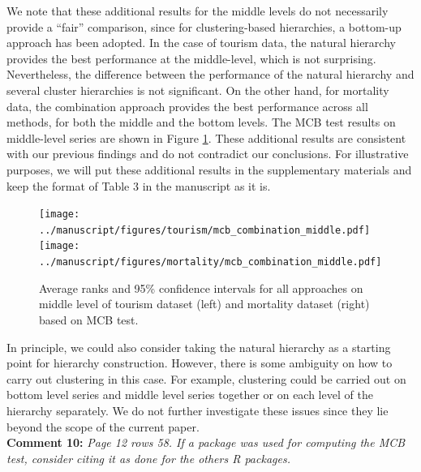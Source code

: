 \documentclass{article}
\numberwithin{equation}{section}
\theoremstyle{plain}
\theoremstyle{definition}
\theoremstyle{remark}
\begin{document}
We note that these additional results for the middle levels do not necessarily provide a ``fair'' comparison, since for clustering-based hierarchies, a bottom-up approach has been adopted.  In the case of tourism data, the natural hierarchy provides the best performance at the middle-level, which is not surprising. Nevertheless, the difference between the performance of the natural hierarchy and several cluster hierarchies is not significant. On the other hand, for mortality data, the combination approach provides the best performance across all methods, for both the middle and the bottom levels. {The MCB test results on middle-level series are shown in Figure \ref{fig:mcb_middle}.} These additional results are consistent with our previous findings and do not contradict our conclusions. For illustrative purposes, we will put these additional results in the supplementary materials and keep the format of Table 3 in the manuscript as it is.\\

\begin{figure}[h!]
    \centering
    \texttt{[image: ../manuscript/figures/tourism/mcb\_combination\_middle.pdf]}
    \texttt{[image: ../manuscript/figures/mortality/mcb\_combination\_middle.pdf]}
    \caption{\label{fig:mcb_middle}Average ranks and 95\% confidence intervals for all approaches on middle level of tourism dataset (left) and mortality dataset (right) based on MCB test.}
\end{figure}

\medskip
In principle, we could also consider taking the natural hierarchy as a starting point for hierarchy construction.
However, there is some ambiguity on how to carry out clustering in this case. For example, clustering could be carried out on bottom level series and middle level series together or on each level of the hierarchy separately. We do not further investigate these issues since they lie beyond the scope of the current paper.\\


\textbf{Comment 10:} \textit{Page 12 rows 58. If a package was used for computing the MCB test, consider citing it as done for the others R packages.}
\end{document}
